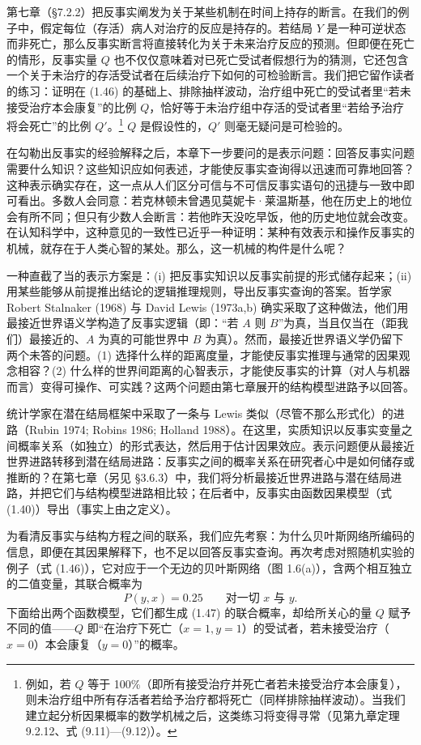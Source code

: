 第七章（\S 7.2.2）把反事实阐发为关于某些机制在时间上持存的断言。在我们的例子中，假定每位（存活）病人对治疗的反应是持存的。若结局 $Y$ 是一种可逆状态而非死亡，那么反事实断言将直接转化为关于未来治疗反应的预测。但即便在死亡的情形，反事实量 $Q$ 也不仅仅意味着对已死亡受试者假想行为的猜测，它还包含一个关于未治疗的存活受试者在后续治疗下如何的可检验断言。我们把它留作读者的练习：证明在 \textup{(1.46)} 的基础上、排除抽样波动，治疗组中死亡的受试者里“若未接受治疗本会康复”的比例 $Q$，恰好等于未治疗组中存活的受试者里“若给予治疗将会死亡”的比例 $Q'$。\footnote{例如，若 $Q$ 等于 100\%（即所有接受治疗并死亡者若未接受治疗本会康复），则未治疗组中所有存活者若给予治疗都将死亡（同样排除抽样波动）。当我们建立起分析因果概率的数学机械之后，这类练习将变得寻常（见第九章定理 9.2.12、式 \textup{(9.11)}—\textup{(9.12)}）。} $Q$ 是假设性的，$Q'$ 则毫无疑问是可检验的。

在勾勒出反事实的经验解释之后，本章下一步要问的是表示问题：回答反事实问题需要什么知识？这些知识应如何表述，才能使反事实查询得以迅速而可靠地回答？这种表示确实存在，这一点从人们区分可信与不可信反事实语句的迅捷与一致中即可看出。多数人会同意：若克林顿未曾遇见莫妮卡·莱温斯基，他在历史上的地位会有所不同；但只有少数人会断言：若他昨天没吃早饭，他的历史地位就会改变。在认知科学中，这种意见的一致性已近乎一种证明：某种有效表示和操作反事实的机械，就存在于人类心智的某处。那么，这一机械的构件是什么呢？

一种直截了当的表示方案是：(i) 把反事实知识以反事实前提的形式储存起来；(ii) 用某些能够从前提推出结论的逻辑推理规则，导出反事实查询的答案。哲学家 Robert Stalnaker (1968) 与 David Lewis (1973a,b) 确实采取了这种做法，他们用最接近世界语义学构造了反事实逻辑（即：“若 $A$ 则 $B$”为真，当且仅当在（距我们）最接近的、$A$ 为真的可能世界中 $B$ 为真）。然而，最接近世界语义学仍留下两个未答的问题。(1) 选择什么样的距离度量，才能使反事实推理与通常的因果观念相容？(2) 什么样的世界间距离的心智表示，才能使反事实的计算（对人与机器而言）变得可操作、可实践？这两个问题由第七章展开的结构模型进路予以回答。

统计学家在潜在结局框架中采取了一条与 Lewis 类似（尽管不那么形式化）的进路（Rubin 1974; Robins 1986; Holland 1988）。在这里，实质知识以反事实变量之间概率关系（如独立）的形式表达，然后用于估计因果效应。表示问题便从最接近世界进路转移到潜在结局进路：反事实之间的概率关系在研究者心中是如何储存或推断的？在第七章（另见 \S 3.6.3）中，我们将分析最接近世界进路与潜在结局进路，并把它们与结构模型进路相比较；在后者中，反事实由函数因果模型（式 \textup{(1.40)}）导出（事实上由之定义）。

为看清反事实与结构方程之间的联系，我们应先考察：为什么贝叶斯网络所编码的信息，即便在其因果解释下，也不足以回答反事实查询。再次考虑对照随机实验的例子（式 \textup{(1.46)}），它对应于一个无边的贝叶斯网络（图 1.6(a)），含两个相互独立的二值变量，其联合概率为
\begin{equation}
P(y,x) = 0.25 \qquad\text{对一切 } x \text{ 与 } y. \tag{1.47}
\end{equation}
下面给出两个函数模型，它们都生成 \textup{(1.47)} 的联合概率，却给所关心的量 $Q$ 赋予不同的值——$Q$ 即“在治疗下死亡（$x=1,y=1$）的受试者，若未接受治疗（$x=0$）本会康复（$y=0$）”的概率。

